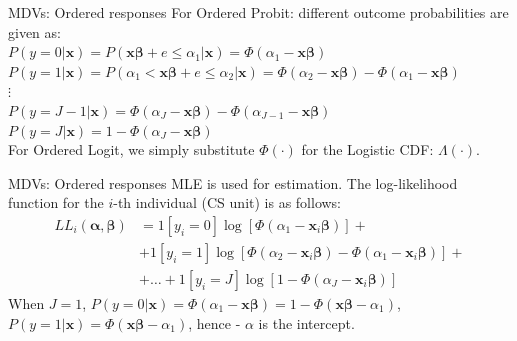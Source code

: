 \documentclass[usenames,dvipsnames]{beamer}
\begin{document}
\begin{frame}{MDVs: Ordered responses}
For Ordered Probit: different outcome probabilities are given as: \\
\bigskip
$P(y=0|\bm{x})=P(\bm{x \beta} + e \le \alpha_1 | \bm{x})=\Phi(\alpha_1 - \bm{x \beta})$ \\
\medskip
$P(y=1|\bm{x})=P(\alpha_1 < \bm{x \beta} + e \le \alpha_2 | \bm{x}) = \Phi(\alpha_2 - \bm{x \beta}) - \Phi(\alpha_1 - \bm{x \beta})$ \\
\medskip
$\vdots$ \\
\medskip
$P(y=J-1|\bm{x}) = \Phi(\alpha_J - \bm{x \beta}) - \Phi(\alpha_{J-1} - \bm{x \beta})$ \\
\medskip
$P(y=J|\bm{x}) = 1 - \Phi(\alpha_J - \bm{x \beta})$ \\
\bigskip
For Ordered Logit, we simply substitute $\Phi(\cdot)$ for the Logistic CDF: $\Lambda (\cdot)$.
\end{frame}
\begin{frame}{MDVs: Ordered responses}
MLE is used for estimation. The log-likelihood function for the $i$-th individual (CS unit) is as follows:  \\
\begin{align*}
LL_i (\bm{\alpha, \beta}) & = 1 [y_i = 0] \log[\Phi(\alpha_1 - \bm{x}_i \bm{\beta})] + \\
& + 1[y_i = 1] \log[\Phi(\alpha_2 - \bm{x}_i \bm{\beta}) - \Phi(\alpha_1 - \bm{x}_i \bm{\beta})] + \\
& + \dots + 1[y_i = J] \log[1-\Phi(\alpha_J - \bm{x}_i \bm{\beta})]
\end{align*}
When $J=1$, $P(y=0|\bm{x}) = \Phi(\alpha_1 - \bm{x \beta}) = 1-\Phi(\bm{x \beta} - \alpha_1)$, \\
\smallskip
$P(y=1|\bm{x}) = \Phi(\bm{x \beta} - \alpha_1)$, hence - $\alpha$ is the intercept. 
\end{frame}
\end{document}
